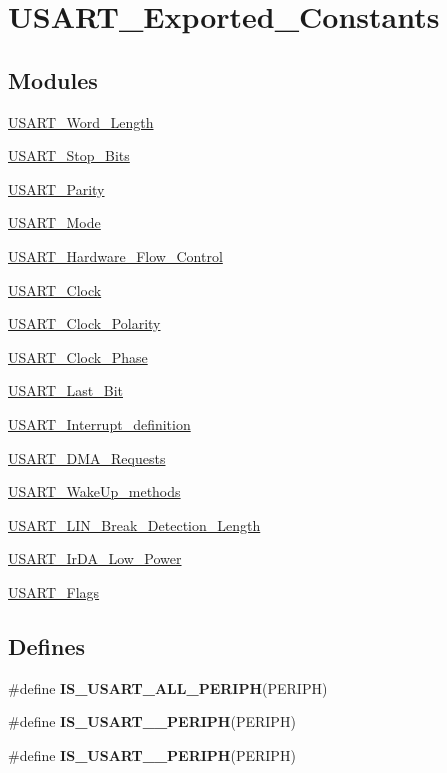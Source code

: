 \hypertarget{group__USART__Exported__Constants}{
\section{USART\_\-Exported\_\-Constants}
\label{group__USART__Exported__Constants}
}
\subsection*{Modules}
\begin{DoxyCompactItemize}
\item 
\hyperlink{group__USART__Word__Length}{USART\_\-Word\_\-Length}
\item 
\hyperlink{group__USART__Stop__Bits}{USART\_\-Stop\_\-Bits}
\item 
\hyperlink{group__USART__Parity}{USART\_\-Parity}
\item 
\hyperlink{group__USART__Mode}{USART\_\-Mode}
\item 
\hyperlink{group__USART__Hardware__Flow__Control}{USART\_\-Hardware\_\-Flow\_\-Control}
\item 
\hyperlink{group__USART__Clock}{USART\_\-Clock}
\item 
\hyperlink{group__USART__Clock__Polarity}{USART\_\-Clock\_\-Polarity}
\item 
\hyperlink{group__USART__Clock__Phase}{USART\_\-Clock\_\-Phase}
\item 
\hyperlink{group__USART__Last__Bit}{USART\_\-Last\_\-Bit}
\item 
\hyperlink{group__USART__Interrupt__definition}{USART\_\-Interrupt\_\-definition}
\item 
\hyperlink{group__USART__DMA__Requests}{USART\_\-DMA\_\-Requests}
\item 
\hyperlink{group__USART__WakeUp__methods}{USART\_\-WakeUp\_\-methods}
\item 
\hyperlink{group__USART__LIN__Break__Detection__Length}{USART\_\-LIN\_\-Break\_\-Detection\_\-Length}
\item 
\hyperlink{group__USART__IrDA__Low__Power}{USART\_\-IrDA\_\-Low\_\-Power}
\item 
\hyperlink{group__USART__Flags}{USART\_\-Flags}
\end{DoxyCompactItemize}
\subsection*{Defines}
\begin{DoxyCompactItemize}
\item 
\#define {\bfseries IS\_\-USART\_\-ALL\_\-PERIPH}(PERIPH)
\item 
\#define {\bfseries IS\_\-USART\_\_\-PERIPH}(PERIPH)
\item 
\#define {\bfseries IS\_\-USART\_\_\-PERIPH}(PERIPH)
\end{DoxyCompactItemize}



